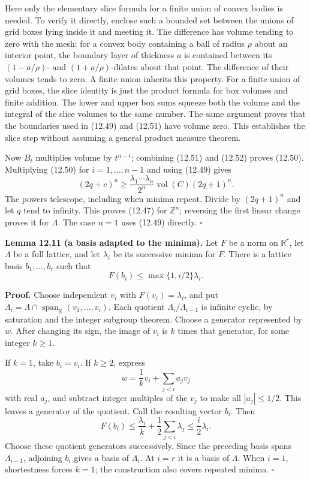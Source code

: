 \documentclass[
  11pt,
  a4paper,
]{article}
\begin{document}
Here only the elementary slice formula for a finite union of convex
bodies is needed. To verify it directly, enclose such a bounded set
between the unions of grid boxes lying inside it and meeting it. The
difference has volume tending to zero with the mesh: for a convex body
containing a ball of radius \(\rho\) about an interior point, the
boundary layer of thickness \(a\) is contained between its
\((1-a/\rho)\)- and \((1+a/\rho)\)-dilates about that point. The
difference of their volumes tends to zero. A finite union inherits this
property. For a finite union of grid boxes, the slice identity is just
the product formula for box volumes and finite addition. The lower and
upper box sums squeeze both the volume and the integral of the slice
volumes to the same number. The same argument proves that the boundaries
used in (12.49) and (12.51) have volume zero. This establishes the slice
step without assuming a general product measure theorem.

Now \(B_t\) multiplies volume by \(t^{n-i}\); combining (12.51) and
(12.52) proves (12.50). Multiplying (12.50) for \(i=1,\ldots,n-1\) and
using (12.49) gives \[
(2q+c)^n\ge
\frac{\lambda_1\cdots\lambda_n}{2^n}
       \operatorname{vol}(C)(2q+1)^n.
\tag{12.54}
\] The powers telescope, including when minima repeat. Divide by
\((2q+1)^n\) and let \(q\) tend to infinity. This proves (12.47) for
\(\mathbb Z^n\); reversing the first linear change proves it for
\(\Lambda\). The case \(n=1\) uses (12.49) directly. \(\square\)

\textbf{Lemma 12.11 (a basis adapted to the minima).} Let \(F\) be a
norm on \(\mathbb R^r\), let \(\Lambda\) be a full lattice, and let
\(\lambda_i\) be its successive minima for \(F\). There is a lattice
basis \(b_1,\ldots,b_r\) such that \[
F(b_i)\le\max\{1,i/2\}\lambda_i.
\tag{12.55}
\]

\textbf{Proof.} Choose independent \(v_i\) with \(F(v_i)=\lambda_i\),
and put \(\Lambda_i=\Lambda\cap\operatorname{span}_{\mathbb R}
(v_1,\ldots,v_i)\). Each quotient \(\Lambda_i/\Lambda_{i-1}\) is
infinite cyclic, by saturation and the integer subgroup theorem. Choose
a generator represented by \(w\). After changing its sign, the image of
\(v_i\) is \(k\) times that generator, for some integer \(k\ge1\).

If \(k=1\), take \(b_i=v_i\). If \(k\ge2\), express \[
w=\frac1k v_i+\sum_{j<i}a_jv_j
\] with real \(a_j\), and subtract integer multiples of the \(v_j\) to
make all \(|a_j|\le1/2\). This leaves a generator of the quotient. Call
the resulting vector \(b_i\). Then \[
F(b_i)\le\frac{\lambda_i}{k}
                +\frac12\sum_{j<i}\lambda_j
          \le\frac i2\lambda_i.
\] Choose these quotient generators successively. Since the preceding
basis spans \(\Lambda_{i-1}\), adjoining \(b_i\) gives a basis of
\(\Lambda_i\). At \(i=r\) it is a basis of \(\Lambda\). When \(i=1\),
shortestness forces \(k=1\); the construction also covers repeated
minima. \(\square\)
\end{document}

